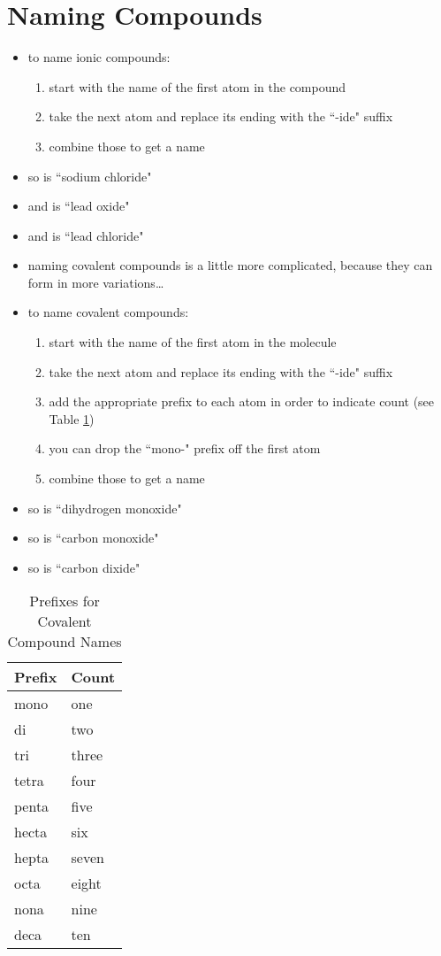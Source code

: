 \documentclass[11pt, oneside]{article}   	%
\begin{document}
\section{Naming Compounds}
\begin{itemize}
\item to name ionic compounds:
\begin{enumerate}
\item start with the name of the first atom in the compound
\item take the next atom and replace its ending with the ``-ide" suffix
\item combine those to get a name
\end{enumerate}
\item so  is ``sodium chloride"
\item and  is ``lead oxide"
\item and  is ``lead chloride"
\item naming covalent compounds is a little more complicated, because they can form in more variations\ldots
\item to name covalent compounds:
\begin{enumerate}
\item start with the name of the first atom in the molecule
\item take the next atom and replace its ending with the ``-ide" suffix
\item add the appropriate prefix to each atom in order to indicate count (see Table \ref{table:covalent-prefix})
\item you can drop the ``mono-" prefix off the first atom
\item combine those to get a name
\end{enumerate}
\item so  is ``dihydrogen monoxide"
\item so  is ``carbon monoxide"
\item so  is ``carbon dixide"
\end{itemize}

\begin{table}
\centering
\begin{tabular}[b]{| l | l |}
\textbf{Prefix} & \textbf{Count} \\
\hline
mono & one \\
di       & two \\
tri       & three \\
tetra       & four \\
penta       & five \\
hecta       & six \\
hepta       & seven \\
octa       & eight \\
nona       & nine \\
deca       & ten \\
\end{tabular}
\caption{Prefixes for Covalent Compound Names}
\label{table:covalent-prefix}
\end{table}
\end{document}
